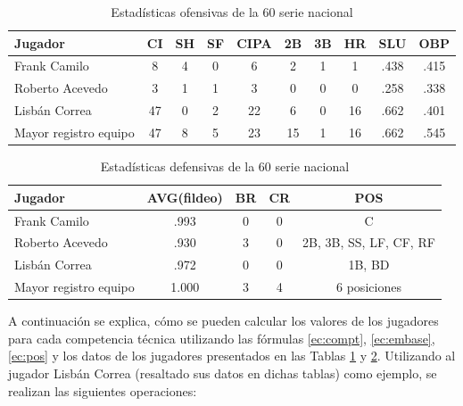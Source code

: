 \begin{table}[H]
	\centering
	\caption{Estadísticas ofensivas de la 60 serie nacional}\label{estadistica-of}
	\begin{tabular}{l c c c c c c c c c }
		\toprule[1.7pt]
		Jugador          & CI & SH & SF & CIPA & 2B & 3B & HR & SLU  & OBP                    \\ \midrule
		Frank Camilo    & 8  & 4  & 0  & 6    & 2  & 1  & 1  & .438 & .415 \\
		Roberto Acevedo & 3  & 1  & 1  & 3    & 0  & 0  & 0  & .258 & .338  \\
		\rowcolor{gray!30} Lisbán Correa   & 47 & 0  & 2  & 22   & 6  & 0  & 16 & .662 & .401  \\ \midrule
		
		\multicolumn{1}{p{4cm}}{Mayor registro equipo} & 47 & 8& 5& 23&15&1&16&.662& .545\\ \bottomrule[1pt]
	\end{tabular}
\end{table}


\begin{table}[H]
		\centering
	\caption{Estadísticas defensivas de la 60 serie nacional}\label{estadistica-def}
		\begin{tabular}{l c c c c}
			\toprule[1.7pt]
			Jugador      &     AVG(fildeo) & BR & CR & POS                    \\ \midrule
			Frank Camilo  &   .993        & 0  & 0  & C                      \\
			Roberto Acevedo&  .930        & 3  & 0  & 2B, 3B, SS, LF, CF, RF \\
			\rowcolor{gray!30} Lisbán Correa   & .972        & 0  & 0  & 1B, BD \\ \midrule
			
			\multicolumn{1}{p{4cm}}{Mayor registro equipo}& 1.000 & 3&4 & 6 posiciones\\ 
			\bottomrule[1pt]
		\end{tabular}
	
\end{table}

A continuación se explica, cómo se pueden calcular los valores de los jugadores para cada competencia técnica utilizando las fórmulas \ref{ec:compt}, \ref{ec:embase}, \ref{ec:pos} y los datos de los jugadores presentados en las Tablas \ref{estadistica-of} y \ref{estadistica-def}. Utilizando al jugador Lisbán Correa (resaltado sus datos en dichas tablas) como ejemplo, se realizan las siguientes operaciones:

